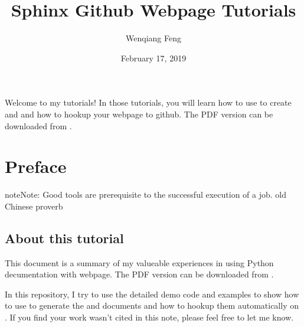 \documentclass[letterpaper,12pt,english]{sphinxmanual}
\title{Sphinx Github Webpage Tutorials}
\date{February 17, 2019}
\author{Wenqiang Feng}
\begin{document}
\pagestyle{empty}
\sphinxmaketitle
\pagestyle{plain}
\sphinxtableofcontents
\pagestyle{normal}
\label{\detokenize{index::doc}}\begin{quote}

\begin{figure}[htbp]
\centering

\noindent{}
\end{figure}
\end{quote}

Welcome to my  tutorials! In those tutorials, you will learn how to use  to create  and  and how to hookup your  webpage to github. The PDF version can be downloaded from .




\chapter{Preface}
\label{\detokenize{preface:preface}}\label{\detokenize{preface:id1}}\label{\detokenize{preface::doc}}
\begin{sphinxadmonition}{note}{Note:}
Good tools are prerequisite to the successful execution of a job. \textendash{} old Chinese proverb
\end{sphinxadmonition}


\section{About this tutorial}
\label{\detokenize{preface:about-this-tutorial}}
This document is a summary of my valueable experiences in using Python decumentation  with  webpage. The PDF version can be downloaded from . 

In this repository, I try to use the detailed demo code and
examples to show how to use  to generate the  and  documents and how to hookup them automatically on . If you find your work wasn’t cited in this note, please feel free to let me know.
\end{document}

